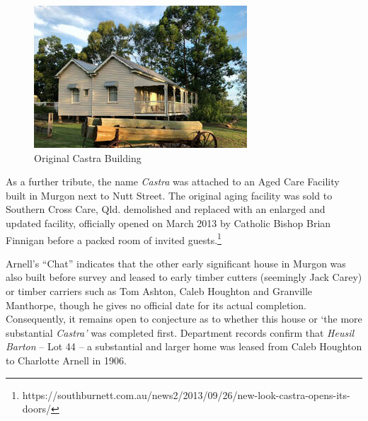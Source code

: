\begin{figure}
\begin{center}
\includegraphics[width=1.\linewidth,center]{../images/castraOld.png}
\caption{Original Castra Building}
\end{center}
\end{figure}




As a further tribute, the name \emph{Castra} was attached to an Aged Care Facility built in Murgon next to Nutt Street. The original aging facility was sold to Southern Cross Care, Qld. demolished and replaced with an enlarged and updated facility, officially opened on March 2013 by Catholic Bishop Brian Finnigan before a packed room of invited guests.\footnote{https://southburnett.com.au/news2/2013/09/26/new-look-castra-opens-its-doors/}


Arnell's ``Chat'' indicates that the other early significant house in Murgon was also built before survey and leased to early timber cutters (seemingly Jack Carey) or timber carriers such as Tom Ashton, Caleb Houghton and Granville Manthorpe, though he gives no official date for its actual completion. Consequently, it remains open to conjecture as to whether this house or `the more substantial \emph{Castra'} was completed first. Department records confirm that \emph{Heusil Barton} -- Lot 44 -- a substantial and larger home was leased from Caleb Houghton to Charlotte Arnell in 1906.



